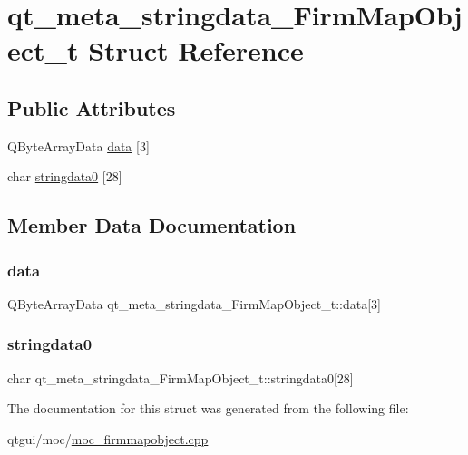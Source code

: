 \hypertarget{structqt__meta__stringdata___firm_map_object__t}{}\section{qt\+\_\+meta\+\_\+stringdata\+\_\+\+Firm\+Map\+Object\+\_\+t Struct Reference}
\label{structqt__meta__stringdata___firm_map_object__t}
\subsection*{Public Attributes}
\begin{DoxyCompactItemize}
\item 
Q\+Byte\+Array\+Data \mbox{\hyperlink{structqt__meta__stringdata___firm_map_object__t_a233d87d262a473262ddb9789422a0933}{data}} \mbox{[}3\mbox{]}
\item 
char \mbox{\hyperlink{structqt__meta__stringdata___firm_map_object__t_aab99cb10903b53c9b0277644f4fbf0ec}{stringdata0}} \mbox{[}28\mbox{]}
\end{DoxyCompactItemize}


\subsection{Member Data Documentation}
\mbox{\label{structqt__meta__stringdata___firm_map_object__t_a233d87d262a473262ddb9789422a0933}} 
\subsubsection{\texorpdfstring{data}{data}}
{\footnotesize\ttfamily Q\+Byte\+Array\+Data qt\+\_\+meta\+\_\+stringdata\+\_\+\+Firm\+Map\+Object\+\_\+t\+::data\mbox{[}3\mbox{]}}

\mbox{\label{structqt__meta__stringdata___firm_map_object__t_aab99cb10903b53c9b0277644f4fbf0ec}} 
\subsubsection{\texorpdfstring{stringdata0}{stringdata0}}
{\footnotesize\ttfamily char qt\+\_\+meta\+\_\+stringdata\+\_\+\+Firm\+Map\+Object\+\_\+t\+::stringdata0\mbox{[}28\mbox{]}}



The documentation for this struct was generated from the following file\+:\begin{DoxyCompactItemize}
\item 
qtgui/moc/\mbox{\hyperlink{moc__firmmapobject_8cpp}{moc\+\_\+firmmapobject.\+cpp}}\end{DoxyCompactItemize}

